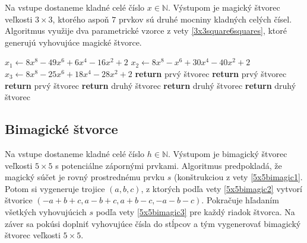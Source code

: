 \begin{alg}
\label{algsquare3x3x}
Na vstupe dostaneme kladné celé číslo $x \in \mathbb{N}$. Výstupom je magický štvorec veľkosti $3 \times 3$, ktorého aspoň $7$ prvkov sú druhé mocniny kladných celých čísel. Algoritmus využije dva parametrické vzorce z vety \ref{3x3square6squares}, ktoré generujú vyhovujúce magické štvorce.
\end{alg}

\begin{algorithmic}
\STATE $x_1 \gets 8x^8 - 49x^6 + 6x^4 - 16x^2 + 2$
\STATE $x_2 \gets 8x^8 - x^6 + 30x^4 - 40x^2 + 2$
\STATE $x_3 \gets 8x^8 - 25x^6 + 18x^4 - 28x^2 + 2$
    \STATE \textbf{return} prvý štvorec
\ENDIF
{}
    \STATE \textbf{return} prvý štvorec
\ENDIF
{}
    \STATE \textbf{return} prvý štvorec
\ENDIF
{}
    \STATE \textbf{return} druhý štvorec
\ENDIF
{}
    \STATE \textbf{return} druhý štvorec
\ENDIF
{}
    \STATE \textbf{return} druhý štvorec
\ENDIF
\end{algorithmic}

\subsection{Bimagické štvorce}

\begin{alg}
\label{algsquare5x5b}
Na vstupe dostaneme kladné celé číslo $h \in \mathbb{N}$. Výstupom je bimagický štvorec veľkosti $5 \times 5$ s potenciálne zápornými prvkami. Algoritmus predpokladá, že magický súčet je rovný prostrednému prvku $s$ (konštrukciou z vety \ref{5x5bimagic1}. Potom si vygeneruje trojice $(a,b,c)$, z ktorých podľa vety \ref{5x5bimagic2} vytvorí štvorice $(-a+b+c, a-b+c, a+b-c, -a-b-c)$. Pokračuje hľadaním všetkých vyhovujúcich $s$ podľa vety \ref{5x5bimagic3} pre každý riadok štvorca. Na záver sa pokúsi doplniť vyhovujúce čísla do stĺpcov a tým vygenerovať bimagický štvorec veľkosti $5 \times 5$.
\end{alg}

